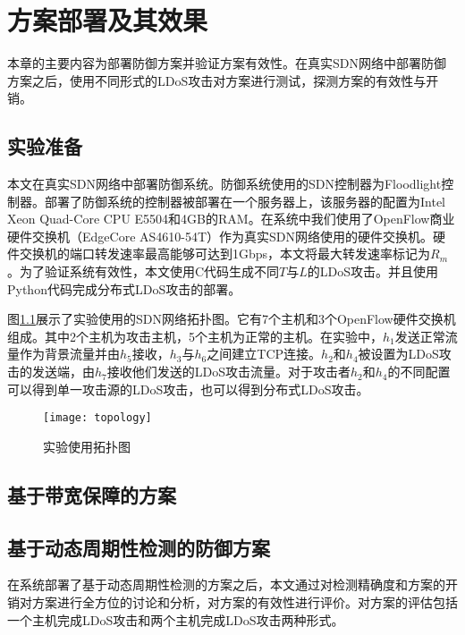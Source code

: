 \chapter{方案部署及其效果}
\label{cha:experiment}
本章的主要内容为部署防御方案并验证方案有效性。在真实SDN网络中部署防御方案之后，使用不同形式的LDoS攻击对方案进行测试，探测方案的有效性与开销。

\section{实验准备}
\label{chap5:setup}
本文在真实SDN网络中部署防御系统。防御系统使用的SDN控制器为Floodlight控制器。部署了防御系统的控制器被部署在一个服务器上，该服务器的配置为Intel Xeon Quad-Core CPU E5504和4GB的RAM。在系统中我们使用了OpenFlow商业硬件交换机（EdgeCore AS4610-54T）作为真实SDN网络使用的硬件交换机。硬件交换机的端口转发速率最高能够可达到1Gbps，本文将最大转发速率标记为$R_m$。为了验证系统有效性，本文使用C代码生成不同$T$与$L$的LDoS攻击。并且使用Python代码完成分布式LDoS攻击的部署。

图\ref{fig:topology}展示了实验使用的SDN网络拓扑图。它有7个主机和3个OpenFlow硬件交换机组成。其中2个主机为攻击主机，5个主机为正常的主机。在实验中，$h_1$发送正常流量作为背景流量并由$h_5$接收，$h_3$与$h_6$之间建立TCP连接。$h_2$和$h_4$被设置为LDoS攻击的发送端，由$h_7$接收他们发送的LDoS攻击流量。对于攻击者$h_2$和$h_4$的不同配置可以得到单一攻击源的LDoS攻击，也可以得到分布式LDoS攻击。


\begin{figure}
    \centering
    \texttt{[image: topology]}
    \caption{实验使用拓扑图}
    \label{fig:topology}
\end{figure}


\section{基于带宽保障的方案}

\section{基于动态周期性检测的防御方案}
\label{chap5:expperioddetection}
在系统部署了基于动态周期性检测的方案之后，本文通过对检测精确度和方案的开销对方案进行全方位的讨论和分析，对方案的有效性进行评价。对方案的评估包括一个主机完成LDoS攻击和两个主机完成LDoS攻击两种形式。

